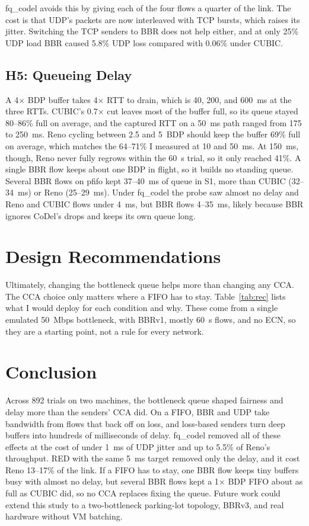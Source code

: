 \documentclass[conference,12pt,letterpaper]{IEEEtran}
\newcommand{\x}{\ensuremath{\times}}
\begin{document}
fq\_codel avoids this by giving each of the four flows a quarter of the link. The cost is that UDP's packets are now interleaved with TCP bursts, which raises its jitter. Switching the TCP senders to BBR does not help either, and at only 25\% UDP load BBR caused 5.8\% UDP loss compared with 0.06\% under CUBIC.

\subsection{H5: Queueing Delay}
A 4\x{} BDP buffer takes 4\x{} RTT to drain, which is 40, 200, and 600~ms at the three RTTs. CUBIC's 0.7\x{} cut leaves most of the buffer full, so its queue stayed 80--86\% full on average, and the captured RTT on a 50~ms path ranged from 175 to 250~ms. Reno cycling between 2.5 and 5~BDP should keep the buffer 69\% full on average, which matches the 64--71\% I measured at 10 and 50~ms. At 150~ms, though, Reno never fully regrows within the 60~s trial, so it only reached 41\%. A single BBR flow keeps about one BDP in flight, so it builds no standing queue. Several BBR flows on pfifo kept 37--40~ms of queue in S1, more than CUBIC (32--34~ms) or Reno (25--29~ms). Under fq\_codel the probe saw almost no delay and Reno and CUBIC flows under 4~ms, but BBR flows 4--35~ms, likely because BBR ignores CoDel's drops and keeps its own queue long.

\section{Design Recommendations}

Ultimately, changing the bottleneck queue helps more than changing any CCA. The CCA choice only matters where a FIFO has to stay. Table~\ref{tab:rec} lists what I would deploy for each condition and why. These come from a single emulated 50~Mbps bottleneck, with BBRv1, mostly 60~s flows, and no ECN, so they are a starting point, not a rule for every network.

\section{Conclusion}

Across 892 trials on two machines, the bottleneck queue shaped fairness and delay more than the senders' CCA did. On a FIFO, BBR and UDP take bandwidth from flows that back off on loss, and loss-based senders turn deep buffers into hundreds of milliseconds of delay. fq\_codel removed all of these effects at the cost of under 1~ms of UDP jitter and up to 5.5\% of Reno's throughput. RED with the same 5~ms target removed only the delay, and it cost Reno 13--17\% of the link. If a FIFO has to stay, one BBR flow keeps tiny buffers busy with almost no delay, but several BBR flows kept a 1\x{} BDP FIFO about as full as CUBIC did, so no CCA replaces fixing the queue. Future work could extend this study to a two-bottleneck parking-lot topology, BBRv3, and real hardware without VM batching.
\end{document}

